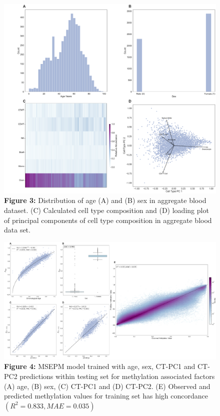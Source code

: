 \documentclass{article}
\begin{document}
{\begin{center}
    \begin{figure}
    \includegraphics[scale=.2]{Figures/Figure3.png}
    \footnotesize
    \caption*{\small \textbf{Figure 3:} Distribution of age (A) and (B) sex in aggregate blood dataset. (C) Calculated cell type composition and (D) loading plot of
 principal components of cell type composition in aggregate blood data set.}
    \end{figure}
\end{center}

\begin{raggedleft}
\begin{figure}
\includegraphics[scale=.15]{Figures/Figure4.png}
\footnotesize
\caption*{\small \textbf{Figure 4:} MSEPM model trained with age, sex, CT-PC1 and CT-PC2 predictions within testing 
set for methylation associated factors (A) age, (B) sex, (C) CT-PC1 and (D) CT-PC2. (E) Observed and predicted
 methylation values for training set has high concordance $(R^2=0.833, MAE=0.035)$}
\end{figure}
\end{raggedleft}

}
\end{document}

